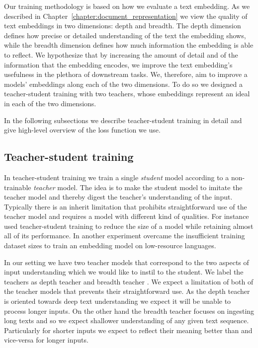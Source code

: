 Our training methodology is based on how we evaluate a text embedding. As we
described in Chapter~\ref{chapter:document_representation} we view the quality
of text embeddings in two dimensions: depth and breadth. The depth dimension
defines how precise or detailed understanding of the text the embedding shows,
while the breadth dimension defines how much information the embedding is able
to reflect. We hypothesize that by increasing the amount of detail and of the
information that the embedding encodes, we improve the text embedding's
usefulness in the plethora of downstream tasks. We, therefore, aim to improve a
models' embeddings along each of the two dimensions. To do so we designed a
teacher-student training with two teachers, whose embeddings represent an ideal
in each of the two dimensions.

In the following subsections we describe teacher-student training in detail and
give high-level overview of the loss function we use.

\subsection{Teacher-student training}

In teacher-student training we train a single \emph{student} model according to
a non-trainable \emph{teacher} model. The idea is to make the student model to
imitate the teacher model and thereby digest the teacher's understanding of the
input. Typically there is an inherit limitation that prohibits straightforward
use of the teacher model and requires a model with different kind of qualities.
For instance \cite{sanh2019distilbert} used teacher-student training to reduce
the size of a model while retaining almost all of its performance. In another
experiment \cite{reimers2020making} overcame the insufficient training dataset
sizes to train an embedding model on low-resource languages.

In our setting we have two teacher models that correspond to the two aspects of
input understanding which we would like to instil to the student. We label the
teachers as depth teacher {\Md} and breadth teacher {\Mb}. We expect a
limitation of both of the teacher models that prevents their straightforward
use. As the depth teacher is oriented towards deep text understanding we expect
it will be unable to process longer inputs. On the other hand the breadth
teacher focuses on ingesting long texts and so we expect shallower understanding
of any given text sequence. Particularly for shorter inputs we expect {\Md} to
reflect their meaning better than {\Mb} and vice-versa for longer inputs.


